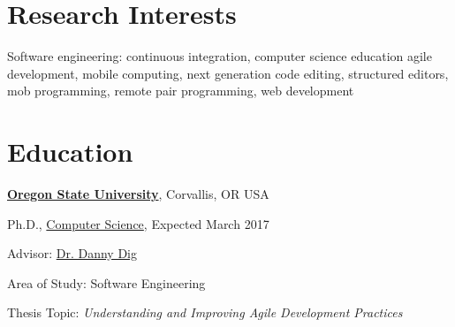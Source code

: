 \documentclass[10pt]{article}
\begin{document}


% 
\thispagestyle{empty}
\section{Research Interests}

Software engineering: 
continuous integration,
computer science education
agile development,  
mobile computing,
next generation code editing,
structured editors,
mob programming,
remote pair programming,
web development 


\vspace{-5pt}

\section{Education}

\href{http://www.oregonstate.edu/}{\textbf{Oregon State University}},
Corvallis, OR USA
\begin{outerlist}
\item[] Ph.D.,
        \vspace{-.2\baselineskip}
        \href{http://eecs.oregonstate.edu/}
             {Computer Science},
             Expected March 2017
        \begin{innerlist}
        \item Advisor:
              \href{http://dig.cs.illinois.edu/}
                   {Dr. Danny Dig}
        \item Area of Study: Software Engineering 
        \item Thesis Topic: \emph{Understanding and Improving Agile Development Practices}

        \end{innerlist}
\end{outerlist}
\vspace{.5\baselineskip}
\end{document}
